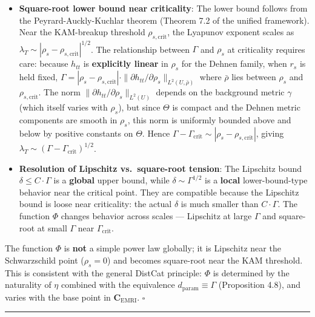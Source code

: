 \documentclass[
]{article}
\begin{document}
\begin{itemize}
\item
  \textbf{Square-root lower bound near criticality}: The lower bound
  follows from the Peyrard-Auckly-Kuchlar theorem (Theorem 7.2 of the
  unified framework). Near the KAM-breakup threshold
  \(\rho_{s,\text{crit}}\), the Lyapunov exponent scales as
  \(\lambda_T \sim |\rho_s - \rho_{s,\text{crit}}|^{1/2}\). The
  relationship between \(\Gamma\) and \(\rho_s\) at criticality requires
  care: because \(h_{tt}\) is \textbf{explicitly linear} in \(\rho_s\)
  for the Dehnen family, when \(r_s\) is held fixed,
  \(\Gamma = |\rho_s - \rho_{s,\text{crit}}| \cdot \|\partial h_{tt}/\partial\rho_s\|_{L^2(U, \bar{\rho})}\)
  where \(\bar{\rho}\) lies between \(\rho_s\) and
  \(\rho_{s,\text{crit}}\). The norm
  \(\|\partial h_{tt}/\partial\rho_s\|_{L^2(U)}\) depends on the
  background metric \(\gamma\) (which itself varies with \(\rho_s\)),
  but since \(\Theta\) is compact and the Dehnen metric components are
  smooth in \(\rho_s\), this norm is uniformly bounded above and below
  by positive constants on \(\Theta\). Hence
  \(\Gamma - \Gamma_{\text{crit}} \sim |\rho_s - \rho_{s,\text{crit}}|\),
  giving \(\lambda_T \sim (\Gamma - \Gamma_{\text{crit}})^{1/2}\).
\item
  \textbf{Resolution of Lipschitz vs.~square-root tension}: The
  Lipschitz bound \(\delta \leq C \cdot \Gamma\) is a \textbf{global}
  upper bound, while \(\delta \sim \Gamma^{1/2}\) is a \textbf{local}
  lower-bound-type behavior near the critical point. They are compatible
  because the Lipschitz bound is loose near criticality: the actual
  \(\delta\) is much smaller than \(C \cdot \Gamma\). The function
  \(\Phi\) changes behavior across scales --- Lipschitz at large
  \(\Gamma\) and square-root at small \(\Gamma\) near
  \(\Gamma_{\text{crit}}\).
\end{itemize}

The function \(\Phi\) is \textbf{not} a simple power law globally; it is
Lipschitz near the Schwarzschild point (\(\rho_s = 0\)) and becomes
square-root near the KAM threshold. This is consistent with the general
DistCat principle: \(\Phi\) is determined by the naturality of \(\eta\)
combined with the equivalence \(d_{\text{param}} \equiv \Gamma\)
(Proposition 4.8), and varies with the base point in
\(\mathbf{C}_{\text{EMRI}}\). \(\square\)

\begin{center}\rule{0.5\linewidth}{0.5pt}\end{center}
\end{document}

